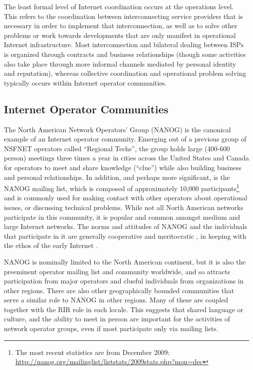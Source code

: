 The least formal level of Internet coordination occurs at the operations level.
This refers to the coordination between interconnecting service providers that
is necessary in order to implement that interconnection, as well as to solve
other problems or work towards developments that are only manifest in
operational Internet infrastructure. Most interconnection and bilateral dealing
between ISPs is organized through contracts and business relationships (though
some activities also take place through more informal channels mediated by
personal identity and reputation), whereas collective coordination and
operational problem solving typically occurs within Internet operator
communities.

\subsection{Internet Operator Communities}

The North American Network Operators' Group (NANOG) is the canonical example of
an Internet operator community. Emerging out of a previous group of NSFNET
operators called ``Regional Techs'', the group holds large (400-600 person)
meetings three times a year in cities across the United States and Canada for
operators to meet and share knowledge (``clue'') while also building business
and personal relationships. In addition, and perhaps more significant, is the
NANOG mailing list, which is composed of approximately 10,000
participants\footnote{The most recent statistics are from December 2009:
\url{http://nanog.org/mailinglist/liststats/2009stats.php?mon=dec}} and is
commonly used for making contact with other operators about operational issues,
or discussing technical problems. While not all North American networks
participate in this community, it is popular and common amongst medium and large
Internet networks. The norms and attitudes of NANOG and the individuals that
participate in it are generally cooperative and meritocratic
\cite{Mathew:2010ly}, in keeping with the ethos of the early Internet
\cite{Abbate:2000ve}.

NANOG is nominally limited to the North American continent, but it is also the
preeminent operator mailing list and community worldwide, and so attracts
participation from major operators and clueful individuals from organizations
in other regions. There are also other geographically bounded communities that
serve a similar role to NANOG in other regions. Many of these are coupled
together with the RIR role in each locale. This suggests that shared language
or culture, and the ability to meet in person are important for
the activities of network operator groups, even if most participate only via
mailing lists.


